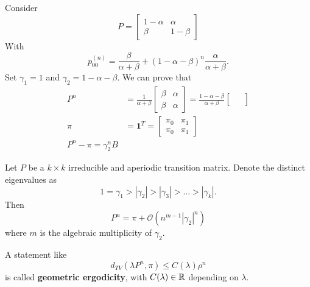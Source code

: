 \documentclass{article}
\begin{document}
	\begin{example}
		Consider \[   P=\begin{bmatrix}
			1-\alpha & \alpha \\
			\beta & 1-\beta
		\end{bmatrix}\]
		With
		\[
		p_{00}^{(n)}=\frac{\beta}{\alpha+\beta}+(1-\alpha-\beta)^n\frac{\alpha}{\alpha+\beta}.
		\]
		Set $\gamma_1=1$ and $\gamma_2=1-\alpha-\beta$.
		We can prove that
		\begin{align*}
			P^n &=\frac{1}{\alpha+\beta}\begin{bmatrix}
				\beta & \alpha \\
				\beta & \alpha
			\end{bmatrix}=\frac{1-\alpha-\beta}{\alpha+\beta}\begin{bmatrix}
				& \\
				& \\
			\end{bmatrix}\\
			\pi &=\mathbf{1}^T=\begin{bmatrix}
				\pi_0 & \pi_1 \\
				\pi_0 & \pi_1
			\end{bmatrix}\\
			P^n-\pi=\gamma_2^n B
		\end{align*} %
	\end{example}
	\begin{theorem}
		Let $P$ be a $k\times k$ irreducible and aperiodic transition matrix. Denote the distinct eigenvalues as
		\[1=\gamma_1>|\gamma_2|>|\gamma_3|>\ldots>|\gamma_k|.\]Then
		\[P^n=\pi+
		\mathcal{O}(n^{m-1}|\gamma_2|^n)\] where $m$ is the algebraic multiplicity of $\gamma_2$.
	\end{theorem}
	\begin{definition}
		A statement like\[
		d_{TV}(\lambda P^n,\pi)\leqslant C(\lambda)\rho^n
		\] is called \textbf{geometric ergodicity}, with $C(\lambda)\in\mathbb{R}$ depending on $\lambda$.
	\end{definition}
\end{document}
